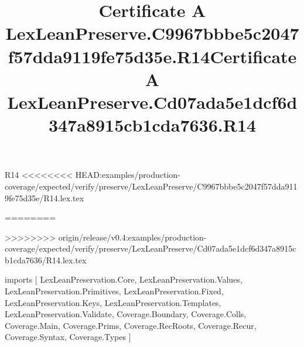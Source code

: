 \begin{lexlean}{R14}
<<<<<<<< HEAD:examples/production-coverage/expected/verify/preserve/LexLeanPreserve/C9967bbbe5c2047f57dda9119fe75d35e/R14.lex.tex
\title{Certificate A LexLeanPreserve.C9967bbbe5c2047f57dda9119fe75d35e.R14}
========
\title{Certificate A LexLeanPreserve.Cd07ada5e1dcf6d347a8915cb1cda7636.R14}
>>>>>>>> origin/release/v0.4:examples/production-coverage/expected/verify/preserve/LexLeanPreserve/Cd07ada5e1dcf6d347a8915cb1cda7636/R14.lex.tex
\begin{coremodule}
imports [
  LexLeanPreservation.Core,
  LexLeanPreservation.Values,
  LexLeanPreservation.Primitives,
  LexLeanPreservation.Fixed,
  LexLeanPreservation.Keys,
  LexLeanPreservation.Templates,
  LexLeanPreservation.Validate,
  Coverage.Boundary,
  Coverage.Colls,
  Coverage.Main,
  Coverage.Prims,
  Coverage.RecRoots,
  Coverage.Recur,
  Coverage.Syntax,
  Coverage.Types
]


\end{coremodule}
\end{lexlean}
